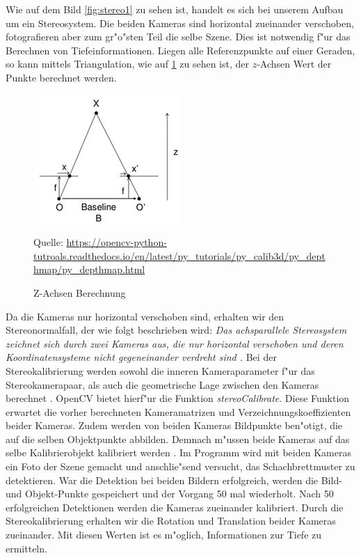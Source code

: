 Wie auf dem Bild \ref{fig:stereo1} zu sehen ist, handelt es sich bei unserem Aufbau um ein Stereosystem. Die beiden Kameras sind horizontal zueinander verschoben, fotografieren aber zum gr"o"sten Teil die selbe Szene. Dies ist notwendig f"ur das Berechnen von Tiefeinformationen. Liegen alle Referenzpunkte auf einer Geraden, so kann mittels Triangulation, wie auf \ref{fig:baseline} zu sehen ist, der $z$-Achsen Wert der Punkte berechnet werden.

\begin{figure}[H]
	\includegraphics[scale=1.5]{bilder/baseline}
	\caption[Z-Achsen Berechnung]{Z-Achsen Berechnung}
	\label{fig:baseline}%
	\small Quelle: \url{https://opencv-python-tutroals.readthedocs.io/en/latest/py_tutorials/py_calib3d/py_depthmap/py_depthmap.html}
\end{figure}

\noindent Da die Kameras nur horizontal verschoben sind, erhalten wir den Stereonormalfall, der wie folgt beschrieben wird: \textit{Das achsparallele Stereosystem zeichnet sich durch zwei Kameras aus, die nur horizontal verschoben und deren Koordinatensysteme nicht gegeneinander verdreht sind \cite{Tu}.} \newline
\noindent Bei der Stereokalibrierung werden sowohl die inneren Kameraparameter f"ur das Stereokamerapaar, als auch die geometrische Lage zwischen den Kameras berechnet \cite{zbs}. OpenCV bietet hierf"ur die Funktion \textit{stereoCalibrate}. Diese Funktion erwartet die vorher berechneten Kameramatrizen und Verzeichnungskoeffizienten beider Kameras. Zudem werden von beiden Kameras Bildpunkte ben"otigt, die auf die selben Objektpunkte abbilden. Demnach m"ussen beide Kameras auf das selbe Kalibrierobjekt kalibriert werden \cite{ocvs}. Im Programm wird mit beiden Kameras ein Foto der Szene gemacht und anschlie"send versucht, das Schachbrettmuster zu detektieren. War die Detektion bei beiden Bildern erfolgreich, werden die Bild- und Objekt-Punkte gespeichert und der Vorgang 50 mal wiederholt. Nach 50 erfolgreichen Detektionen werden die Kameras zueinander kalibriert.\newline
Durch die Stereokalibrierung erhalten wir die Rotation und Translation beider Kameras zueinander. Mit diesen Werten ist es m"oglich, Informationen zur Tiefe zu ermitteln.

